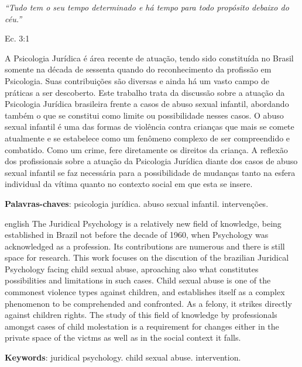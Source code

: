 \documentclass[12pt,oneside,a4paper,english,french,spanish]{abntex2}
\begin{document}
\begin{epigrafe}
    \vspace*{\fill}
	\begin{flushright}
		\textit{``Tudo tem o seu tempo determinado e há tempo para todo propósito debaixo do céu.''}

    Ec. 3:1
	\end{flushright}
\end{epigrafe}


\begin{resumo}
  A Psicologia Jurídica é área recente de atuação, tendo sido constituída no Brasil somente na década de sessenta quando do reconhecimento da profissão em Psicologia. Suas contribuições são diversas e ainda há um vasto campo de práticas a ser descoberto. Este trabalho trata da discussão sobre a atuação da Psicologia Jurídica brasileira frente a casos de abuso sexual infantil, abordando também o que se constitui como limite ou possibilidade nesses casos. O abuso sexual infantil é uma das formas de violência contra crianças que mais se comete atualmente e se estabelece como um fenômeno complexo de ser compreendido e combatido. Como um crime, fere diretamente os direitos da criança. A reflexão dos profissionais sobre a atuação da Psicologia Jurídica diante dos casos de abuso sexual infantil se faz necessária para a possibilidade de mudanças tanto na esfera individual da vítima quanto no contexto social em que esta se insere.

  \vspace{\onelineskip}
    
  \noindent
  \textbf{Palavras-chaves}: psicologia jurídica. abuso sexual infantil. intervenções.
\end{resumo}

\begin{resumo}[Abstract]
  \begin{otherlanguage*}{english}
    The Juridical Psychology is a relatively new field of knowledge, being established in Brazil not before the decade of 1960, when Psychology was acknowledged as a profession. Its contributions are numerous and there is still space for research. This work focuses on the discution of the brazilian Juridical Psychology facing child sexual abuse, aproaching also what constitutes possibilities and limitations in such cases. Child sexual abuse is one of the commonest violence types against children, and establishes itself as a complex phenomenon to be comprehended and confronted. As a felony, it strikes directly against children rights. The study of this field of knowledge by professionals amongst cases of child molestation is a requirement for changes either in the private space of the victms as well as in the social context it falls.

    \vspace{\onelineskip}
 
    \noindent 
    \textbf{Keywords}: juridical psychology. child sexual abuse. intervention.
  \end{otherlanguage*}
\end{resumo}
\end{document}

